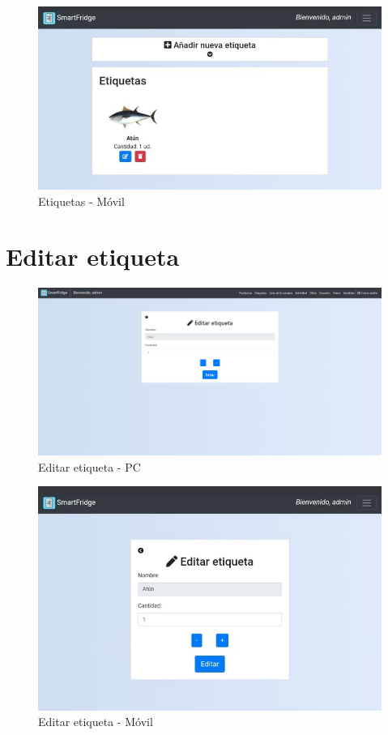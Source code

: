 \begin{figure}[h] 
    \centering
    \includegraphics[width=.50\textwidth]{capitulos/anexotres/Phone/Labels.jpeg}
    \caption{Etiquetas - Móvil}
    \label{fig:labelsphone}
\end{figure}

\newpage
\section{Editar etiqueta}
\begin{figure}[h] 
    \centering
    \includegraphics[width=.90\textwidth]{capitulos/anexotres/PC/EditLabel.png}
    \caption{Editar etiqueta - PC}
    \label{fig:editlabelpc}
\end{figure}

\begin{figure}[h] 
    \centering
    \includegraphics[width=.50\textwidth]{capitulos/anexotres/Phone/EditLabel.jpeg}
    \caption{Editar etiqueta - Móvil}
    \label{fig:editlabelphone}
\end{figure}

\newpage

